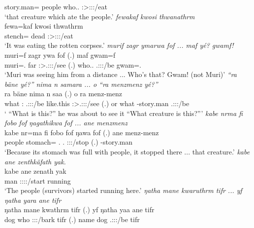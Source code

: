 \begin{exe}
	{\Dem} story.man={\Only} {\Emph} people who.\Erg.{\Sg} \Sg:\Sbj>\Stpl:\Obj:\Pst:\Ipfv/eat {\Emph}\\
	\trans `that creature which ate the people.'
	\emph{fewakaf kwosi thwanathrm}\\
	\gll fewa=kaf kwosi thwathrm\\ 
	stench={\Prop} dead \Sg:\Sbj>\Stpl:\Obj:\Pst:\Dur/eat\\
	\trans `It was eating the rotten corpses.'
	\emph{murif zagr ymarwa fof ... maf yé? gwamf!}\\
	\gll muri=f zagr ywa fof (.) maf  gwam=f\\ 
	muri=\Erg.{\Sg} far \Sg:\Sbj>\Tsg.\Masc:\Obj:\Pst:\Ipfv/see {\Emph} (.) who.\Erg.{\Sg} \Tsg.\Masc:\Sbj:\Nonpast:\Ipfv/be gwam=\Erg.\Sg\\
	\trans `Muri was seeing him from a distance ... Who's that? Gwam! (not Muri)'
	\emph{``ra bäne yé?'' nima n samara ... o ``ra menzmenz yé?''}\\
	\gll ra bäne  nima n saa (.) o ra menz-menz \\ 
	what \Dem:\Med{} \Tsg.\Masc:\Sbj:\Nonpast:\Ipfv/be like.this {\Imn} \Sg:\Sbj>\Tsg.\Masc:\Obj:\Pst:\Pfv/see (.) or what \Redup-story.man \Tsg.\Masc:\Sbj:\Nonpast:\Ipfv/be\\
	\trans ` ``What is this?'' he was about to see it ``What creature is this?'''
	\emph{kabe nrma fi fobo fof ŋagathikwa fof ... ane menzmenz}\\
	\gll kabe nr=ma fi fobo fof ŋawa fof (.) ane menz-menz\\ 
	people stomach={\Char} \Third.{\Abs} \Dist.{\All} {\Emph} \Sg:\Sbj:\Pst:\Ipfv/stop {\Emph} (.) {\Dem} \Redup-story.man\\
	\trans `Because its stomach was full with people, it stopped there ... that creature.'
	\emph{kabe ane zenthkäfath yak.}\\
	\gll kabe ane zenath yak\\ 
	man {\Dem} \Stpl:\Sbj:\Pst:\Ipfv:\Venit/start running\\
	\trans `The people (survivors) started running here.'
	\emph{ŋatha mane kwaruthrm tifr ... yf ŋatha yara ane tifr}\\
	\gll ŋatha mane kwathrm tifr (.) yf ŋatha yaa ane tifr\\ 
	dog who \Sg:\Sbj:\Pst:\Dur/bark tifr (.) name dog \Tsg.\Masc:\Sbj:\Pst:\Ipfv/be {\Dem} tifr\\

\end{exe}
